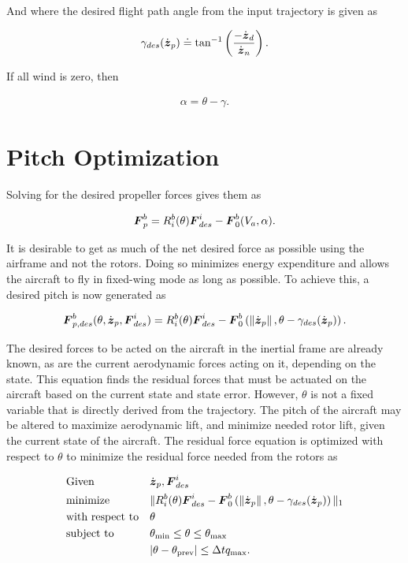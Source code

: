 And where the desired flight path angle from the input trajectory is given as

\begin{align}
    \gamma_{des}(\dot{\boldsymbol{z}}_p) \doteq \tan^{-1}\left(\frac{-\dot{\boldsymbol{z}}_{d}}{\dot{\boldsymbol{z}}_{n}}\right).
\end{align}

If all wind is zero, then

\begin{align}
    \alpha = \theta - \gamma.
\end{align}

\section{Pitch Optimization}
\label{sec:PitchOptimization}

Solving for the desired propeller forces gives them as

\begin{align}
    \boldsymbol{F}_p^b = R_i^b(\theta)\boldsymbol{F}_{des}^i - \boldsymbol{F}_0^b(V_a, \alpha).
\end{align}

It is desirable to get as much of the net desired force as possible using the airframe and not the rotors.
Doing so minimizes energy expenditure and allows the aircraft to fly in fixed-wing mode as long as possible.
To achieve this, a desired pitch is now generated as 

\begin{equation}
    \label{eq:desired_propeller_force}
    \boldsymbol{F}_{p,des}^b(\theta, \dot{\boldsymbol{z}}_p, \boldsymbol{F}^i_{des}) = R_i^b(\theta)\boldsymbol{F}_{des}^i - \boldsymbol{F}_0^b\left(\left\|\dot{\boldsymbol{z}}_p\right\|, \theta-\gamma_{des}(\dot{\boldsymbol{z}}_p)\right).
\end{equation}

The desired forces to be acted on the aircraft in the inertial frame are already known, as are the current aerodynamic forces acting on it, depending on the state.
This equation finds the residual forces that must be actuated on the aircraft based on the current state and state error.
However, $\theta$ is not a fixed variable that is directly derived from the trajectory.
The pitch of the aircraft may be altered to maximize aerodynamic lift, and minimize needed rotor lift, given the current state of the aircraft.
The residual force equation is optimized with respect to $\theta$ to minimize the residual force needed from the rotors as

\begin{equation}
\label{eq:pitch_optimization}
\begin{aligned}
    &\text{Given}&& \dot{\boldsymbol{z}}_p, \boldsymbol{F}_{des}^i\\
    &\text{minimize} &&\|R_i^b(\theta)\boldsymbol{F}_{des}^i - \boldsymbol{F}_0^b\left(\left\|\dot{\boldsymbol{z}}_p\right\|, \theta-\gamma_{des}(\dot{\boldsymbol{z}}_p)\right)\|_1 \\
    &\text{with respect to} && \theta\\
    &\text{subject to} 
    && \theta_{\min} \leq \theta \leq \theta_{\max} \\
    &&& |\theta - \theta_{\text{prev}} | \leq \Delta t q_{\max}
    .
\end{aligned}
\end{equation}

